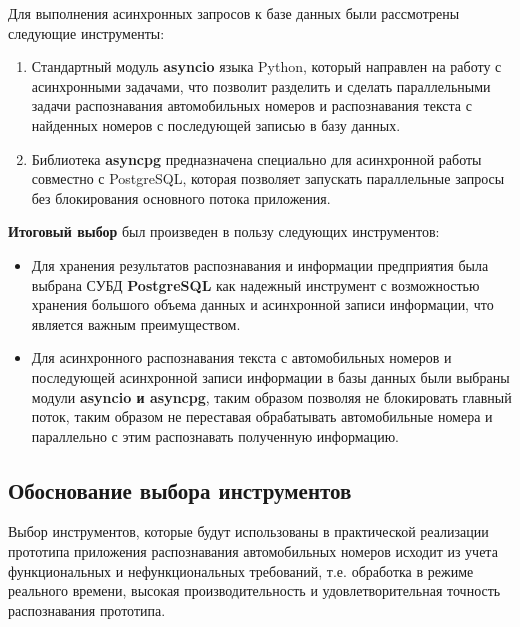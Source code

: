 \documentclass[a4paper,12pt]{article}
\begin{document}
Для выполнения асинхронных запросов к базе данных были рассмотрены следующие инструменты:
\begin{enumerate}
    \item Стандартный модуль \textbf{asyncio} языка Python, который направлен на работу с асинхронными задачами, что позволит разделить и сделать параллельными задачи распознавания автомобильных номеров и распознавания текста с найденных номеров с последующей записью в базу данных.
    \item Библиотека \textbf{asyncpg} предназначена специально для асинхронной работы совместно с PostgreSQL, которая позволяет запускать параллельные запросы без блокирования основного потока приложения.
\end{enumerate}

\textbf{Итоговый выбор} был произведен в пользу следующих инструментов:
\begin{itemize}
    \item Для хранения результатов распознавания и информации предприятия была выбрана СУБД \textbf{PostgreSQL} как надежный инструмент с возможностью хранения большого объема данных и асинхронной записи информации, что является важным преимуществом.
    \item Для асинхронного распознавания текста с автомобильных номеров и последующей асинхронной записи информации в базы данных были выбраны модули \textbf{asyncio и asyncpg}, таким образом позволяя не блокировать главный поток, таким образом не переставая обрабатывать автомобильные номера и параллельно с этим распознавать полученную информацию.
\end{itemize}

\subsection{Обоснование выбора инструментов}

Выбор инструментов, которые будут использованы в практической реализации прототипа приложения распознавания автомобильных номеров исходит из учета функциональных и нефункциональных требований, т.е. обработка в режиме реального времени, высокая производительность и удовлетворительная точность распознавания прототипа.
\end{document}
